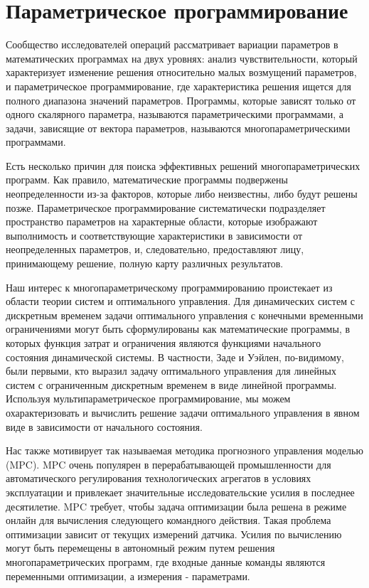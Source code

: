 \chapter{Параметрическое программирование}\label{chap2}

Сообщество исследователей операций рассматривает вариации параметров в математических программах на двух уровнях: анализ чувствительности, который характеризует изменение решения относительно малых возмущений параметров, и параметрическое программирование, где характеристика решения ищется для полного диапазона значений параметров. Программы, которые зависят только от одного скалярного параметра, называются параметрическими программами, а задачи, зависящие от вектора параметров, называются многопараметрическими программами.

Есть несколько причин для поиска эффективных решений многопараметрических программ. Как правило, математические программы подвержены неопределенности из-за факторов, которые либо неизвестны, либо будут решены позже. Параметрическое программирование систематически подразделяет пространство параметров на характерные области, которые изображают выполнимость и соответствующие характеристики в зависимости от неопределенных параметров, и, следовательно, предоставляют лицу, принимающему решение, полную карту различных результатов.

Наш интерес к многопараметрическому программированию проистекает из области теории систем и оптимального управления. Для динамических систем с дискретным временем задачи оптимального управления с конечными временными ограничениями могут быть сформулированы как математические программы, в которых функция затрат и ограничения являются функциями начального состояния динамической системы. В частности, Заде и Уэйлен, по-видимому, были первыми, кто выразил задачу оптимального управления для линейных систем с ограниченным дискретным временем в виде линейной программы. Используя мультипараметрическое программирование, мы можем охарактеризовать и вычислить решение задачи оптимального управления в явном виде в зависимости от начального состояния.

Нас также мотивирует так называемая методика прогнозного управления моделью (MPC). MPC очень популярен в перерабатывающей промышленности для автоматического регулирования технологических агрегатов в условиях эксплуатации и привлекает значительные исследовательские усилия в последнее десятилетие. MPC требует, чтобы задача оптимизации была решена в режиме онлайн для вычисления следующего командного действия. Такая проблема оптимизации зависит от текущих измерений датчика. Усилия по вычислению могут быть перемещены в автономный режим путем решения многопараметрических программ, где входные данные команды являются переменными оптимизации, а измерения - параметрами.


